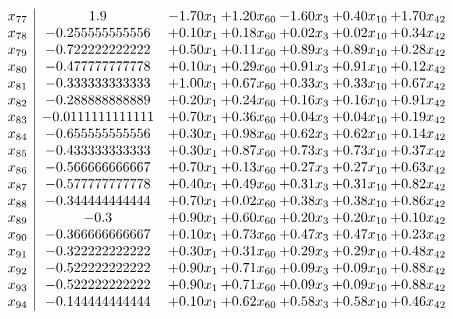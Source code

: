 \documentclass[8pt]{article}
\begin{document}
\[\begin{array}{c| c c@{\hskip 2pt} c@{\hskip 2pt} c@{\hskip 2pt} c@{\hskip 2pt} c@{\hskip 2pt} }
 x_{77}   &  1.9 & -1.70 x_{1} & +  1.20 x_{60} & -1.60 x_{3} & +  0.40 x_{10} & +  1.70 x_{42}\\
 x_{78}   &  -0.255555555556 & +  0.10 x_{1} & +  0.18 x_{60} & +  0.02 x_{3} & +  0.02 x_{10} & +  0.34 x_{42}\\
 x_{79}   &  -0.722222222222 & +  0.50 x_{1} & +  0.11 x_{60} & +  0.89 x_{3} & +  0.89 x_{10} & +  0.28 x_{42}\\
 x_{80}   &  -0.477777777778 & +  0.10 x_{1} & +  0.29 x_{60} & +  0.91 x_{3} & +  0.91 x_{10} & +  0.12 x_{42}\\
 x_{81}   &  -0.333333333333 & +  1.00 x_{1} & +  0.67 x_{60} & +  0.33 x_{3} & +  0.33 x_{10} & +  0.67 x_{42}\\
 x_{82}   &  -0.288888888889 & +  0.20 x_{1} & +  0.24 x_{60} & +  0.16 x_{3} & +  0.16 x_{10} & +  0.91 x_{42}\\
 x_{83}   &  -0.0111111111111 & +  0.70 x_{1} & +  0.36 x_{60} & +  0.04 x_{3} & +  0.04 x_{10} & +  0.19 x_{42}\\
 x_{84}   &  -0.655555555556 & +  0.30 x_{1} & +  0.98 x_{60} & +  0.62 x_{3} & +  0.62 x_{10} & +  0.14 x_{42}\\
 x_{85}   &  -0.433333333333 & +  0.30 x_{1} & +  0.87 x_{60} & +  0.73 x_{3} & +  0.73 x_{10} & +  0.37 x_{42}\\
 x_{86}   &  -0.566666666667 & +  0.70 x_{1} & +  0.13 x_{60} & +  0.27 x_{3} & +  0.27 x_{10} & +  0.63 x_{42}\\
 x_{87}   &  -0.577777777778 & +  0.40 x_{1} & +  0.49 x_{60} & +  0.31 x_{3} & +  0.31 x_{10} & +  0.82 x_{42}\\
 x_{88}   &  -0.344444444444 & +  0.70 x_{1} & +  0.02 x_{60} & +  0.38 x_{3} & +  0.38 x_{10} & +  0.86 x_{42}\\
 x_{89}   &  -0.3 & +  0.90 x_{1} & +  0.60 x_{60} & +  0.20 x_{3} & +  0.20 x_{10} & +  0.10 x_{42}\\
 x_{90}   &  -0.366666666667 & +  0.10 x_{1} & +  0.73 x_{60} & +  0.47 x_{3} & +  0.47 x_{10} & +  0.23 x_{42}\\
 x_{91}   &  -0.322222222222 & +  0.30 x_{1} & +  0.31 x_{60} & +  0.29 x_{3} & +  0.29 x_{10} & +  0.48 x_{42}\\
 x_{92}   &  -0.522222222222 & +  0.90 x_{1} & +  0.71 x_{60} & +  0.09 x_{3} & +  0.09 x_{10} & +  0.88 x_{42}\\
 x_{93}   &  -0.522222222222 & +  0.90 x_{1} & +  0.71 x_{60} & +  0.09 x_{3} & +  0.09 x_{10} & +  0.88 x_{42}\\
 x_{94}   &  -0.144444444444 & +  0.10 x_{1} & +  0.62 x_{60} & +  0.58 x_{3} & +  0.58 x_{10} & +  0.46 x_{42}\\

\end{array}\]
\end{document}
